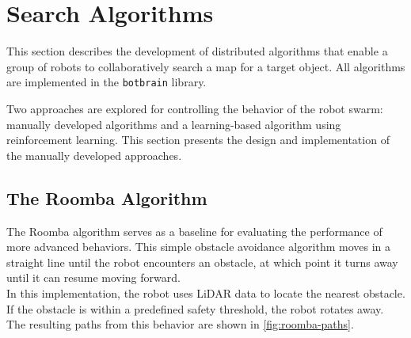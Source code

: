 \section{Search Algorithms}
\label{sec:search-algorithms}

This section describes the development of distributed algorithms that enable a group of robots to collaboratively search a map for a target object. All algorithms are implemented in the \texttt{botbrain} library.

Two approaches are explored for controlling the behavior of the robot swarm: manually developed algorithms and a learning-based algorithm using reinforcement learning. This section presents the design and implementation of the manually developed approaches.

\subsection{The Roomba Algorithm}
The Roomba algorithm serves as a baseline for evaluating the performance of more advanced behaviors. This simple obstacle avoidance algorithm moves in a straight line until the robot encounters an obstacle, at which point it turns away until it can resume moving forward. \\

In this implementation, the robot uses LiDAR data to locate the nearest obstacle. If the obstacle is within a predefined safety threshold, the robot rotates away. The resulting paths from this behavior are shown in \cref{fig:roomba-paths}.

